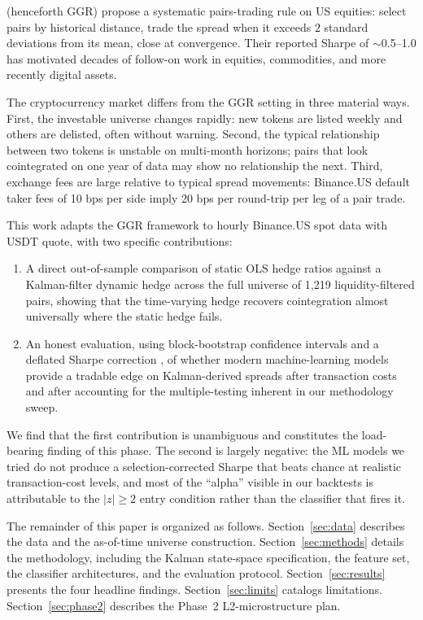 \documentclass[11pt]{article}
\begin{document}
\citet{gatev2006pairs} (henceforth GGR) propose a systematic
pairs-trading rule on US equities: select pairs by historical distance,
trade the spread when it exceeds $2$ standard deviations from its mean,
close at convergence. Their reported Sharpe of $\sim$0.5--1.0 has
motivated decades of follow-on work in equities, commodities, and more
recently digital assets.

The cryptocurrency market differs from the GGR setting in three
material ways. First, the investable universe changes rapidly: new
tokens are listed weekly and others are delisted, often without warning.
Second, the typical relationship between two tokens is unstable on
multi-month horizons; pairs that look cointegrated on one year of data
may show no relationship the next. Third, exchange fees are large
relative to typical spread movements: Binance.US default taker fees of
10 bps per side imply 20 bps per round-trip per leg of a pair trade.

This work adapts the GGR framework to hourly Binance.US spot data with
USDT quote, with two specific contributions:

\begin{enumerate}
    \item A direct out-of-sample comparison of static OLS hedge ratios
    against a Kalman-filter dynamic hedge across the full universe of
    1{,}219 liquidity-filtered pairs, showing that the time-varying
    hedge recovers cointegration almost universally where the static
    hedge fails.
    \item An honest evaluation, using block-bootstrap confidence
    intervals and a deflated Sharpe correction \citep{bailey2014dsr},
    of whether modern machine-learning models provide a tradable edge
    on Kalman-derived spreads after transaction costs and after
    accounting for the multiple-testing inherent in our methodology
    sweep.
\end{enumerate}

We find that the first contribution is unambiguous and constitutes the
load-bearing finding of this phase. The second is largely negative: the
ML models we tried do not produce a selection-corrected Sharpe that
beats chance at realistic transaction-cost levels, and most of the
``alpha'' visible in our backtests is attributable to the
$|z| \geq 2$ entry condition rather than the classifier that fires it.

The remainder of this paper is organized as follows. Section~\ref{sec:data}
describes the data and the as-of-time universe construction. Section~\ref{sec:methods}
details the methodology, including the Kalman state-space specification,
the feature set, the classifier architectures, and the evaluation
protocol. Section~\ref{sec:results} presents the four headline findings.
Section~\ref{sec:limits} catalogs limitations. Section~\ref{sec:phase2}
describes the Phase~2 L2-microstructure plan.
\end{document}
